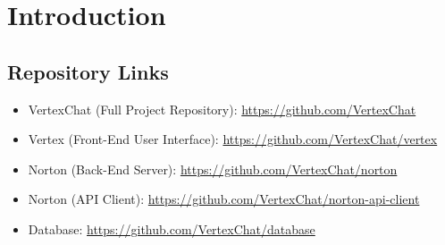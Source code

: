 \chapter{Introduction}
\section{Repository Links}
\begin{itemize}
    \item VertexChat (Full Project Repository): \url{https://github.com/VertexChat}
	\item Vertex (Front-End User Interface): \url{https://github.com/VertexChat/vertex}
	\item Norton (Back-End Server): \url{https://github.com/VertexChat/norton}
	\item Norton (API Client): \url{https://github.com/VertexChat/norton-api-client}
	\item Database: \url{https://github.com/VertexChat/database}
\end{itemize}
